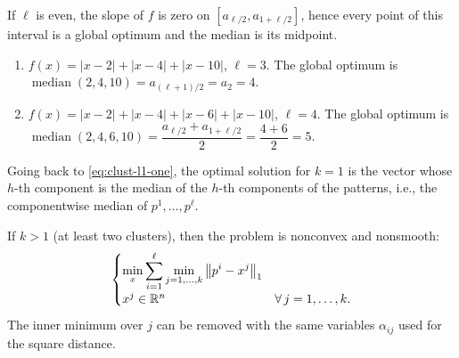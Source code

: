 \begin{remark}
If $\ell$ is even, the slope of $f$ is zero on $[a_{\ell/2}, a_{1+\ell/2}]$, hence every point of this interval is a global optimum and the median is its midpoint.
\end{remark}

\begin{example}
\leavevmode
\begin{enumerate}[label=(\alph*)]
    \item $f(x) = \lvert x-2 \rvert + \lvert x-4 \rvert + \lvert x-10 \rvert$, $\ell = 3$. The global optimum is $\operatorname{median}(2,4,10) = a_{(\ell+1)/2} = a_2 = 4$.
    \item $f(x) = \lvert x-2 \rvert + \lvert x-4 \rvert + \lvert x-6 \rvert + \lvert x-10 \rvert$, $\ell = 4$. The global optimum is $\operatorname{median}(2,4,6,10) = \dfrac{a_{\ell/2} + a_{1+\ell/2}}{2} = \dfrac{4+6}{2} = 5$.
\end{enumerate}
\begin{center}
\hfill
{}
\end{center}
\end{example}

Going back to \eqref{eq:clust-l1-one}, the optimal solution for $k=1$ is the vector whose $h$-th component is the median of the $h$-th components of the patterns, i.e., the componentwise median of $p^1,\dots,p^\ell$.

If $k>1$ (at least two clusters), then the problem is nonconvex and nonsmooth:
\begin{equation}\label{eq:clust-l1}
\begin{cases}
\displaystyle \min_{x} \sum_{i=1}^{\ell} \min_{j=1,\dots,k} \left\lVert p^i - x^j \right\rVert_1\\[1ex]
x^j \in \mathbb{R}^n & \forall\, j=1,\dots,k.
\end{cases}
\end{equation}
The inner minimum over $j$ can be removed with the same variables $\alpha_{ij}$ used for the square distance.

